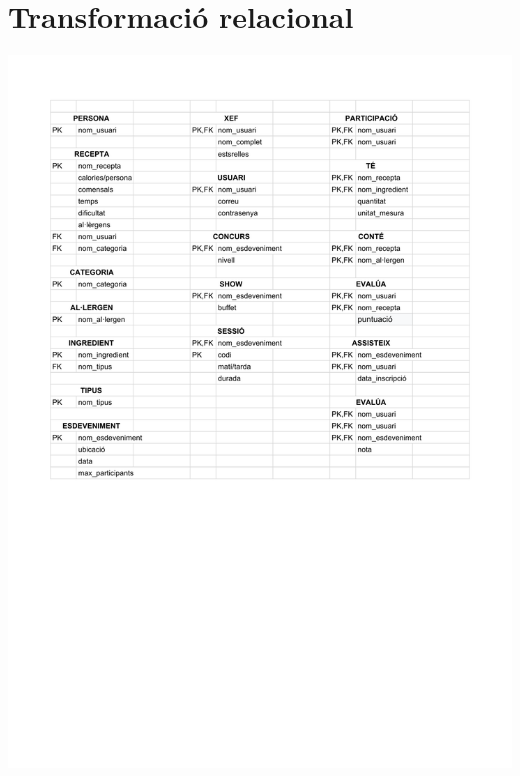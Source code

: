 \documentclass[a4paper,12pt]{article}
\begin{document}
\section{Transformació relacional}
\begin{center}
	\noindent\includegraphics[width=\textwidth]{taula.pdf}
\end{center}
\end{document}
